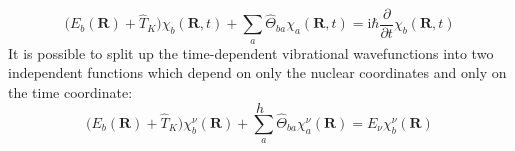 \documentclass[9pt]{report}
\begin{document}
\begin{equation}
\big(E_{b}(\boldsymbol{R})+\hat{T}_{K}\big)\chi_{b}(\boldsymbol{R},t)+\sum_{a}\hat{\Theta}_{ba}\chi_{a}(\boldsymbol{R},t) = \mathrm{i}\hbar\frac{\partial}{\partial t}\chi_{b}(\boldsymbol{R},t)
\end{equation}
It is possible to split up the time-dependent vibrational wavefunctions into two independent functions which depend on only the nuclear coordinates and only on the time coordinate:
\begin{equation}
h
\end{equation}
\begin{equation}
\big(E_{b}(\boldsymbol{R})+\hat{T}_{K}\big)\chi_{b}^{\nu}(\boldsymbol{R})+\sum_{a}\hat{\Theta}_{ba}\chi_{a}^{\nu}(\boldsymbol{R})=E_{\nu}\chi_{b}^{\nu}(\boldsymbol{R})
\end{equation}
\end{document}
